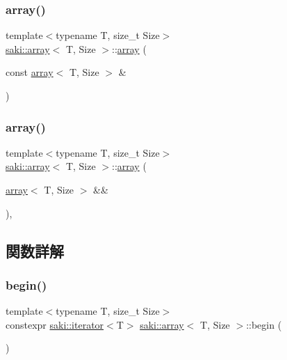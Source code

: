 \subsubsection{\texorpdfstring{array()}{array()}\hspace{0.1cm}{\footnotesize\ttfamily [3/4]}}
{\footnotesize\ttfamily template$<$typename T, size\+\_\+t Size$>$ \\
\mbox{\hyperlink{classsaki_1_1array}{saki\+::array}}$<$ T, Size $>$\+::\mbox{\hyperlink{classsaki_1_1array}{array}} (\begin{DoxyParamCaption}\item[{const \mbox{\hyperlink{classsaki_1_1array}{array}}$<$ T, Size $>$ \&}]{ }\end{DoxyParamCaption})\hspace{0.3cm}{\ttfamily [default]}}

\mbox{\label{classsaki_1_1array_a94b434b999e60647e03a8f3920f66a6d}} 
\subsubsection{\texorpdfstring{array()}{array()}\hspace{0.1cm}{\footnotesize\ttfamily [4/4]}}
{\footnotesize\ttfamily template$<$typename T, size\+\_\+t Size$>$ \\
\mbox{\hyperlink{classsaki_1_1array}{saki\+::array}}$<$ T, Size $>$\+::\mbox{\hyperlink{classsaki_1_1array}{array}} (\begin{DoxyParamCaption}\item[{\mbox{\hyperlink{classsaki_1_1array}{array}}$<$ T, Size $>$ \&\&}]{ }\end{DoxyParamCaption})\hspace{0.3cm}{\ttfamily [default]}, {\ttfamily [noexcept]}}



\subsection{関数詳解}
\mbox{\label{classsaki_1_1array_aa85709bd63dd9f9a5383558b6643a3ba}} 
\subsubsection{\texorpdfstring{begin()}{begin()}\hspace{0.1cm}{\footnotesize\ttfamily [1/2]}}
{\footnotesize\ttfamily template$<$typename T, size\+\_\+t Size$>$ \\
constexpr \mbox{\hyperlink{classsaki_1_1iterator}{saki\+::iterator}}$<$T$>$ \mbox{\hyperlink{classsaki_1_1array}{saki\+::array}}$<$ T, Size $>$\+::begin (\begin{DoxyParamCaption}{ }\end{DoxyParamCaption})\hspace{0.3cm}{\ttfamily [inline]}}

